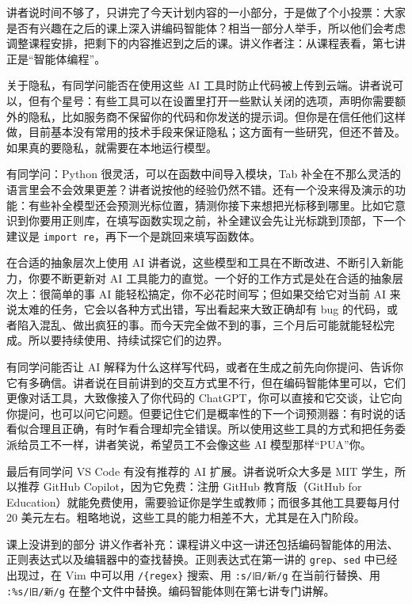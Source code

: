 \documentclass[a4paper]{article}
\begin{document}
讲者说时间不够了，只讲完了今天计划内容的一小部分，于是做了个小投票：大家是否有兴趣在之后的课上深入讲编码智能体？相当一部分人举手，所以他们会考虑调整课程安排，把剩下的内容推迟到之后的课。讲义作者注：从课程表看，第七讲正是“智能体编程”。

关于隐私，有同学问能否在使用这些 AI 工具时防止代码被上传到云端。讲者说可以，但有个星号：有些工具可以在设置里打开一些默认关闭的选项，声明你需要额外的隐私，比如服务商不保留你的代码和你发送的提示词。但你是在信任他们这样做，目前基本没有常用的技术手段来保证隐私；这方面有一些研究，但还不普及。如果真的要隐私，就需要在本地运行模型。

有同学问：Python 很灵活，可以在函数中间导入模块，Tab 补全在不那么灵活的语言里会不会效果更差？讲者说按他的经验仍然不错。还有一个没来得及演示的功能：有些补全模型还会预测光标位置，猜测你接下来想把光标移到哪里。比如它意识到你要用正则库，在填写函数实现之前，补全建议会先让光标跳到顶部，下一个建议是 \texttt{import re}，再下一个是跳回来填写函数体。

\begin{importantbox}{在合适的抽象层次上使用 AI}
讲者说，这些模型和工具在不断改进、不断引入新能力，你要不断更新对 AI 工具能力的直觉。一个好的工作方式是处在合适的抽象层次上：很简单的事 AI 能轻松搞定，你不必花时间写；但如果交给它对当前 AI 来说太难的任务，它会以各种方式出错，写出看起来大致正确却有 bug 的代码，或者陷入混乱、做出疯狂的事。而今天完全做不到的事，三个月后可能就能轻松完成。所以要持续使用、持续试探它们的边界。
\end{importantbox}

有同学问能否让 AI 解释为什么这样写代码，或者在生成之前先向你提问、告诉你它有多确信。讲者说在目前讲到的交互方式里不行，但在编码智能体里可以，它们更像对话工具，大致像接入了你代码的 ChatGPT，你可以直接和它交谈，让它向你提问，也可以问它问题。但要记住它们是概率性的下一个词预测器：有时说的话看似合理且正确，有时乍看合理却完全错误。所以使用这些工具的方式和把任务委派给员工不一样，讲者笑说，希望员工不会像这些 AI 模型那样“PUA”你。

最后有同学问 VS Code 有没有推荐的 AI 扩展。讲者说听众大多是 MIT 学生，所以推荐 GitHub Copilot，因为它免费：注册 GitHub 教育版（GitHub for Education）就能免费使用，需要验证你是学生或教师；而很多其他工具要每月付 20 美元左右。粗略地说，这些工具的能力相差不大，尤其是在入门阶段。

\begin{knowledgebox}{课上没讲到的部分}
讲义作者补充：课程讲义中这一讲还包括编码智能体的用法、正则表达式以及编辑器中的查找替换。正则表达式在第一讲的 \texttt{grep}、\texttt{sed} 中已经出现过，在 Vim 中可以用 \texttt{/\{regex\}} 搜索、用 \texttt{:s/旧/新/g} 在当前行替换、用 \texttt{:\%s/旧/新/g} 在整个文件中替换。编码智能体则在第七讲专门讲解。
\end{knowledgebox}
\end{document}
